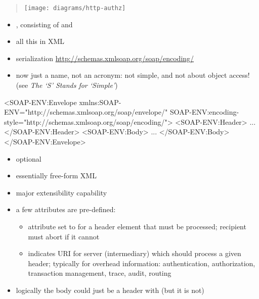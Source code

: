 \documentclass{sepslide-soa-faked} %
\begin{document}
\begin{slide}
\begin{quote}
\texttt{[image: diagrams/http-authz]}
\end{quote}
\end{slide}

\begin{slide}
\begin{itemize}
\item {}, consisting of  and 
\item all this in XML
\item serialization \url{http://schemas.xmlsoap.org/soap/encoding/} 
\item now just a name, not an acronym: not simple, and not about object access!
(see \emph{The `S' Stands for `Simple'})
\end{itemize}
\end{slide}

\begin{slide}
\begin{xml}
<SOAP-ENV:Envelope
  xmlns:SOAP-ENV="http://schemas.xmlsoap.org/soap/envelope/"
  SOAP-ENV:encoding-style="http://schemas.xmlsoap.org/soap/encoding/">
  <SOAP-ENV:Header>
    ...
  </SOAP-ENV:Header>
  <SOAP-ENV:Body>
    ...
  </SOAP-ENV:Body>
</SOAP-ENV:Envelope>
\end{xml}
\end{slide}

\begin{slide}

	\begin{itemize}
	\item optional
	\item essentially free-form XML
	\item major extensibility capability
	\item a few attributes are pre-defined:
\begin{itemize}
	\item {} attribute set to  
		for a header element that must be processed; recipient
		must abort if it cannot
	\item {} indicates URI for server 
		(intermediary) which
		should process a given header;
 typically for overhead information: authentication,
	authorization, transaction management, trace, audit, routing
\end{itemize}
	\item logically the body could just be a header with 
		 (but it is not)
	\end{itemize}
\end{slide}
\end{document}
